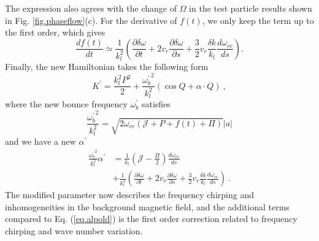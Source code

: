 The expression also agrees with the change of $\Omega$ in the test particle results shown in Fig. \ref{fig.phaseflow}(c).
For the derivative of $f(t)$, we only keep the term up to the first order, which gives
\begin{equation}
    \frac{d f(t)}{d t} \simeq \frac{1}{k_l^2}(\frac{\partial \delta \omega}{\partial t} + 2 v_r \frac{\partial \delta \omega}{\partial s} + \frac{3}{2}v_r\frac{\delta k}{k_l} \frac{d \omega_{ce}}{d s}  ).
\end{equation}
Finally, the new Hamiltonian takes the following form 
\begin{equation}\label{eq.H_frame}
    K^\prime = \frac{k_l^2 P^2}{2} + \frac{{\omega^\prime_{b}}^2}{k_l^2} (\cos Q + \alpha \cdot Q)~,
\end{equation}
where the new bounce frequency $\omega^\prime_{b}$ satisfies
\begin{equation}
    \frac{{\omega^\prime_{b}}^2}{k_l^2} = \sqrt{2\omega_{ce}(\mathcal{J}+P+f(t)+\Pi)}  |a|
\end{equation}
and we have a new $\alpha^\prime$
\begin{equation}\label{eq.alpnew}
    \begin{aligned}
    \frac{{\omega^\prime_{b}}^2}{k_l^2}\alpha^\prime & = \frac{1}{k_l}\left(\mathcal{J} - \frac{\Pi}{2}\right) \frac{d\omega_{ce}}{ds} \\
    & + \frac{1}{k_l^2}\left(\frac{\partial \delta \omega}{\partial t} + 2 v_r \frac{\partial \delta \omega}{\partial s} + \frac{3}{2}v_r\frac{\delta k}{k_l} \frac{d \omega_{ce}}{d s}\right)~.
    \end{aligned}
\end{equation}
The modified parameter now describes the frequency chirping and inhomogeneities in the background magnetic field, and 
the additional terms compared to Eq. (\ref{eq.alpold}) is the first order correction related to frequency chirping and wave number variation.

